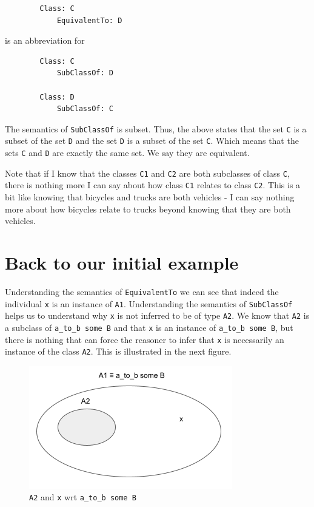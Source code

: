 \documentclass{amsart}
\begin{document}
\begin{small}
	\begin{verbatim} 
		Class: C
		   	EquivalentTo: D
	\end{verbatim}
\end{small}  

is an abbreviation for 

\begin{small}
	\begin{verbatim} 
		Class: C
		    SubClassOf: D
			
		Class: D
	        SubClassOf: C			
	\end{verbatim}
\end{small}   
  
The semantics of \texttt{SubClassOf} is subset. Thus, the above states that the set \texttt{C} is a subset of the set \texttt{D} and the set \texttt{D} is a subset of the set \texttt{C}. Which means that the sets \texttt{C} and \texttt{D} are exactly the same set. We say they are equivalent.

Note that if I know that the classes \texttt{C1} and \texttt{C2} are both subclasses of class \texttt{C}, there is nothing more I can say about how class \texttt{C1} relates to class \texttt{C2}. This is a bit like knowing that bicycles and trucks are both vehicles - I can say nothing more about how bicycles relate to trucks beyond knowing that they are both vehicles.


\section{Back to our initial example}
Understanding the semantics of \texttt{EquivalentTo} we can see that indeed the individual \texttt{x} is an instance of \texttt{A1}. Understanding the semantics of \texttt{SubClassOf} helps us to understand why \texttt{x} is not inferred to be of type \texttt{A2}. We know that \texttt{A2} is a subclass of \texttt{a\_to\_b some B} and that \texttt{x} is an instance of \texttt{a\_to\_b some B}, but there is nothing that can force the reasoner to infer that \texttt{x} is necessarily an instance of the class \texttt{A2}. This is illustrated in the next figure.

\begin{figure}
	\centering \includegraphics[trim = 0mm 0mm 0mm 0mm, clip, scale=0.9]{./images/EquivalenceVersusSubClassOf-Cropped.png}
	\caption{\texttt{A2} and \texttt{x} wrt \texttt{a\_to\_b some B}}
\end{figure}
\end{document}
